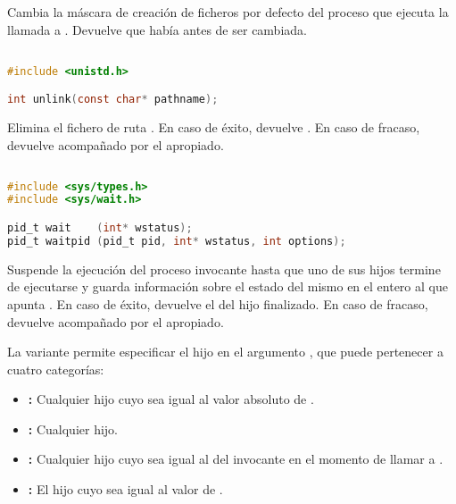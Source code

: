 Cambia la máscara de creación de ficheros por defecto del proceso que ejecuta la llamada a .
Devuelve que había antes de ser cambiada.

\pagebreak

\subsection{}\label{unlink}

\begin{lstlisting}[language=C]
#include <unistd.h>

int unlink(const char* pathname);
\end{lstlisting}

Elimina el fichero de ruta .
En caso de éxito, devuelve .
En caso de fracaso, devuelve  acompañado por el  apropiado.

\subsection{}\label{wait}

\begin{lstlisting}[language=C]
#include <sys/types.h>
#include <sys/wait.h>

pid_t wait    (int* wstatus);
pid_t waitpid (pid_t pid, int* wstatus, int options);
\end{lstlisting}

Suspende la ejecución del proceso invocante hasta que uno de sus hijos termine de ejecutarse y guarda información sobre el estado del mismo en el entero al que apunta .
En caso de éxito, devuelve el  del hijo finalizado.
En caso de fracaso, devuelve  acompañado por el  apropiado.

La variante  permite especificar el hijo en el argumento , que puede pertenecer a cuatro categorías:

\begin{itemize}
	\item{}\textbf{:} Cualquier hijo cuyo  sea igual al valor absoluto de .
	\item{}\textbf{:} Cualquier hijo.
	\item{}\textbf{:} Cualquier hijo cuyo  sea igual al del invocante en el momento de llamar a .
	\item{}\textbf{:} El hijo cuyo  sea igual al valor de .
\end{itemize}

